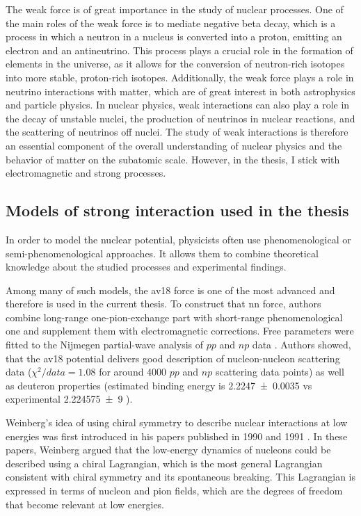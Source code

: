 The weak force is of great importance in the study of nuclear processes. One of the main roles of the weak force is to mediate 
negative  beta decay,
which is a process in which a neutron in a nucleus is converted into a proton, emitting an electron and an antineutrino. This process plays
a crucial role in the formation of elements in the universe, as it allows for the conversion of neutron-rich isotopes into more stable,
proton-rich isotopes. Additionally, the weak force plays a role in neutrino interactions with matter, which are of great interest in both
astrophysics and particle physics. In nuclear physics, weak interactions can also play a role in the decay of unstable nuclei, the
production of neutrinos in nuclear reactions, and the scattering of neutrinos off nuclei. The study of weak interactions is therefore an
essential component of the overall understanding of nuclear physics and the behavior of matter on the subatomic scale.
However, in the thesis, I stick with electromagnetic and strong processes.


\subsection*{Models of strong interaction used in the thesis}

In order to model the nuclear potential, physicists often use phenomenological
or semi-phenomenological approaches. It allows them to combine
theoretical knowledge about the studied processes and experimental findings.

Among many of such models, the \gls{av18} \cite{AV18Wiringa} force is one of the most
advanced and therefore is used in the current thesis.
To construct that \gls{nn} force, authors combine
long-range one-pion-exchange part
with short-range phenomenological one and supplement them with electromagnetic corrections.
Free parameters were fitted to
the Nijmegen partial-wave analysis of $pp$ and $np$ data \cite{NijmegenPhysRevC.48.792}. 
Authors showed, that the \gls{av18} potential delivers good 
description of nucleon-nucleon scattering data ($\chi ^2/data = 1.08$ for around \num{4000} $pp$ and $np$ scattering data points) 
as well as deuteron properties (estimated binding energy is \SI{2.2247(35)}{\mev} vs experimental \SI{ 2.224 575(9)}{\mev} \cite{VANDERLEUN1982261}).

Weinberg's idea of using chiral symmetry to describe nuclear interactions at low
energies was first introduced in his papers published in 1990 and 1991 \cite{WEINBERG1990,WEINBERG1991}.
In these papers, Weinberg argued that the low-energy dynamics of nucleons
could be described using a chiral Lagrangian, which is the most general
Lagrangian consistent with chiral symmetry and its spontaneous breaking.
This Lagrangian is expressed in terms of nucleon and pion fields,
which are the degrees of freedom that become relevant at low energies.

